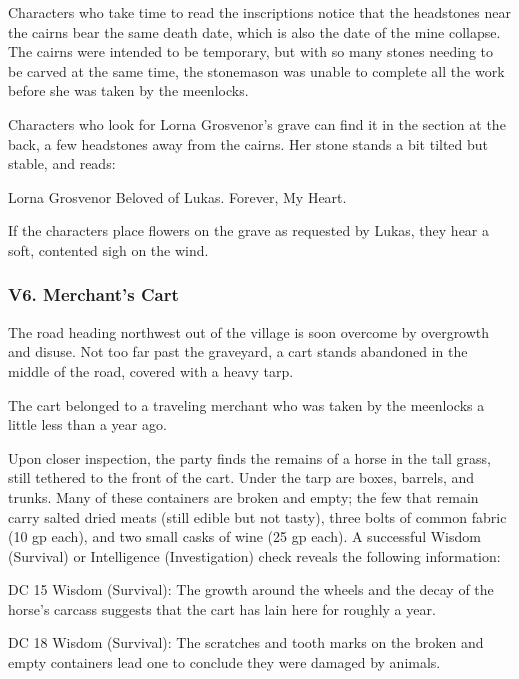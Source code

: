\documentclass[10pt,a4paper,twoside,bg=print,twocolumn,openany,nodeprecatedcode]{dndbook}
\begin{document}
Characters who take time to read the inscriptions notice that the headstones near the cairns bear the same death date, which is also the date of the mine collapse. The cairns were intended to be temporary, but with so many stones needing to be carved at the same time, the stonemason was unable to complete all the work before she was taken by the meenlocks.

Characters who look for Lorna Grosvenor's grave can find it in the section at the back, a few headstones away from the cairns. Her stone stands a bit tilted but stable, and reads:

\begin{DndSidebar}[float=!b]{Lorna Grosvenor}
Beloved of Lukas. Forever, My Heart.



\end{DndSidebar}

If the characters place flowers on the grave as requested by Lukas, they hear a soft, contented sigh on the wind.

\subsubsection{V6. Merchant's Cart}
\begin{DndReadAloud}{}
The road heading northwest out of the village is soon overcome by overgrowth and disuse. Not too far past the graveyard, a cart stands abandoned in the middle of the road, covered with a heavy tarp.

\end{DndReadAloud}

The cart belonged to a traveling merchant who was taken by the meenlocks a little less than a year ago.

Upon closer inspection, the party finds the remains of a horse in the tall grass, still tethered to the front of the cart. Under the tarp are boxes, barrels, and trunks. Many of these containers are broken and empty; the few that remain carry salted dried meats (still edible but not tasty), three bolts of common fabric (10 gp each), and two small casks of wine (25 gp each). A successful Wisdom (Survival) or Intelligence (Investigation) check reveals the following information:

DC 15 Wisdom (Survival): The growth around the wheels and the decay of the horse's carcass suggests that the cart has lain here for roughly a year.

DC 18 Wisdom (Survival): The scratches and tooth marks on the broken and empty containers lead one to conclude they were damaged by animals.
\end{document}
